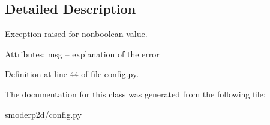 \subsection{Detailed Description}
\begin{DoxyVerb}Exception raised for nonboolean value.

Attributes:
    msg  -- explanation of the error
\end{DoxyVerb}
 

Definition at line 44 of file config.\-py.



The documentation for this class was generated from the following file\-:\begin{DoxyCompactItemize}
\item 
smoderp2d/config.\-py\end{DoxyCompactItemize}
